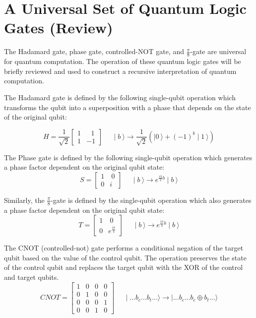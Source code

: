 \documentclass[reqno]{amsart}
\theoremstyle{definition}
\theoremstyle{remark}
\begin{document}
\section{A Universal Set of Quantum Logic Gates (Review)}
\noindent
The Hadamard gate, phase gate, controlled-NOT gate, and $\frac{\pi}{8}$-gate
are universal for quantum computation. The operation of these quantum logic
gates will be briefly reviewed and used to construct a recursive interpretation
of quantum computation.

\noindent
The Hadamard gate is defined by the following single-qubit operation
which transforms the qubit into a superposition with a phase that depends on the state
of the original qubit:

\begin{equation}
H=
\frac{1}{\sqrt{2}}
\begin{bmatrix}
 1 &\:\:\:1
 \\1 &-1 
\end{bmatrix}
\:\:\:\:\:\:
\mid b\:\rangle\rightarrow \frac{1}{\sqrt{2}}(\mid0\:\rangle+(-1)^b\mid1\:\rangle)
\end{equation}

\noindent
The Phase gate is defined by the following single-qubit operation which
generates a phase factor dependent on the original qubit state:
\begin{equation}
S=
\begin{bmatrix}
 1 &\:0
 \\0 &i 
\end{bmatrix}
\:\:\:\:\:\:
\mid b\:\rangle\rightarrow e^{\frac{i\pi}{2}b}\mid b\:\rangle
\end{equation}


\noindent
Similarly, the $\frac{\pi}{8}$-gate is defined by the single-qubit operation 
which also generates a phase factor dependent on the original
qubit state:
\begin{equation}
T=
\begin{bmatrix}
 1 &\:0
 \\0 &e^{ \frac{i\pi}{4}} 
\end{bmatrix}
\:\:\:\:\:\:
\mid b\:\rangle\rightarrow e^{\frac{i\pi}{4}b}\mid b\:\rangle
\end{equation}

\noindent
The CNOT (controlled-not) gate performs a conditional negation of the target qubit 
based on the value of the control qubit. The operation preserves the state of the control
qubit and replaces the target qubit with the XOR of the control and target qubits.
\begin{equation}
CNOT=
\begin{bmatrix}
  1 &0 &0 &0
\\0 &1 &0 &0
\\0 &0 &0 &1
\\0 &0 &1 &0 
\end{bmatrix}
\:\:\:\:\:\:
\mid ...b_c...b_t...\rangle\rightarrow \mid ...b_c...b_c\oplus b_t...\rangle
\end{equation}
\end{document}
